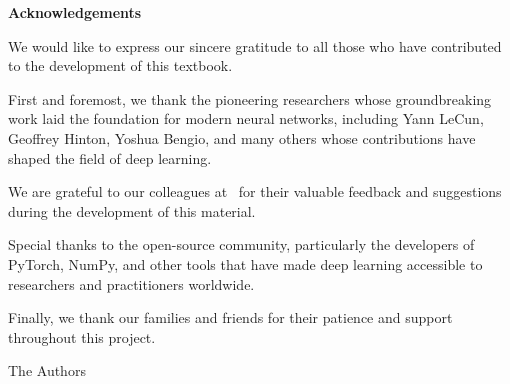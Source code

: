 \newpage
\thispagestyle{empty}

\vspace*{2cm}

\begin{center}
    \Large\textbf{Acknowledgements}
\end{center}

\vspace{1.5cm}

We would like to express our sincere gratitude to all those who have contributed to the development of this textbook.

First and foremost, we thank the pioneering researchers whose groundbreaking work laid the foundation for modern neural networks, including Yann LeCun, Geoffrey Hinton, Yoshua Bengio, and many others whose contributions have shaped the field of deep learning.

We are grateful to our colleagues at \thesisSchool\ for their valuable feedback and suggestions during the development of this material.

Special thanks to the open-source community, particularly the developers of PyTorch, NumPy, and other tools that have made deep learning accessible to researchers and practitioners worldwide.

Finally, we thank our families and friends for their patience and support throughout this project.

\vspace{2cm}

\begin{flushright}
    The Authors\\
    \thesisDate
\end{flushright}

\newpage
